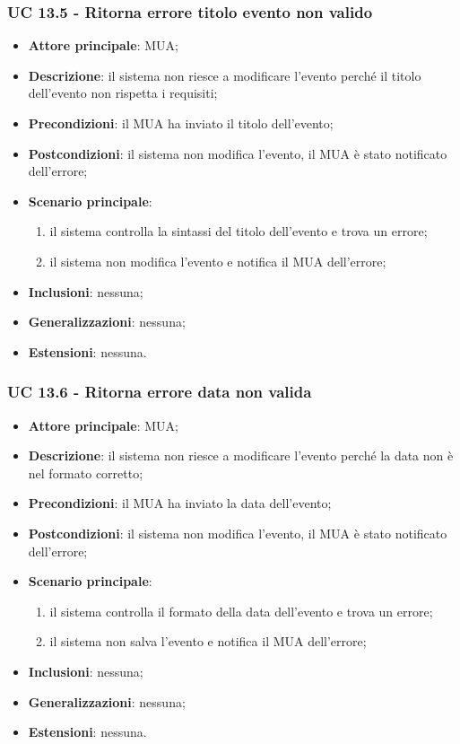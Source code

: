     \subsubsection{UC 13.5 - Ritorna errore titolo evento non valido} \label{sec:UC13.5}
    \begin{itemize}
        \item \textbf{Attore principale}: MUA;
        \item \textbf{Descrizione}: il sistema non riesce a modificare l'evento perché il titolo dell'evento non rispetta i requisiti;
        \item \textbf{Precondizioni}: il MUA ha inviato il titolo dell'evento;
        \item \textbf{Postcondizioni}: il sistema non modifica l'evento, il MUA è stato notificato dell'errore;
        \item \textbf{Scenario principale}:
            \begin{enumerate}
                \item il sistema controlla la sintassi del titolo dell'evento e trova un errore;
                \item il sistema non modifica l'evento e notifica il MUA dell'errore;
            \end{enumerate}
        \item \textbf{Inclusioni}: nessuna;
        \item \textbf{Generalizzazioni}: nessuna;
        \item \textbf{Estensioni}: nessuna.
    \end{itemize}


    \subsubsection{UC 13.6 - Ritorna errore data non valida} \label{sec:UC13.6}
    \begin{itemize}
        \item \textbf{Attore principale}: MUA;
        \item \textbf{Descrizione}: il sistema non riesce a modificare l'evento perché la data non è nel formato corretto;
        \item \textbf{Precondizioni}: il MUA ha inviato la data dell'evento;
        \item \textbf{Postcondizioni}: il sistema non modifica l'evento, il MUA è stato notificato dell'errore;
        \item \textbf{Scenario principale}:
            \begin{enumerate}
                \item il sistema controlla il formato della data dell'evento e trova un errore;
                \item il sistema non salva l'evento e notifica il MUA dell'errore;
            \end{enumerate}
        \item \textbf{Inclusioni}: nessuna;
        \item \textbf{Generalizzazioni}: nessuna;
        \item \textbf{Estensioni}: nessuna.
    \end{itemize}

